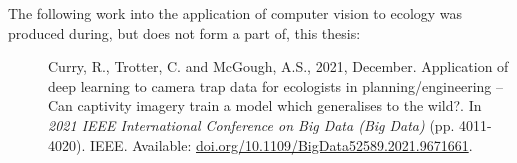 \noindent The following work into the application of computer vision to ecology was produced during, but does not form a part of, this thesis:

\begin{description}
	\item[\cite{curry_application_2021}] Curry, R., Trotter, C. and McGough, A.S., 2021, December. Application of deep learning to camera trap data for ecologists in planning/engineering – Can captivity imagery train a model which generalises to the wild?. In \textit{2021 IEEE International Conference on Big Data (Big Data)} (pp. 4011-4020). IEEE. Available: \href{	https://doi.org/10.1109/BigData52589.2021.9671661}{doi.org/10.1109/BigData52589.2021.9671661}.
\end{description}



